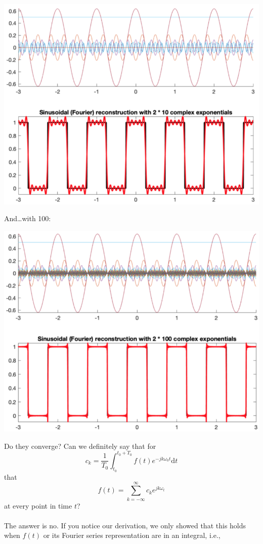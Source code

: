 \documentclass[10pt]{article}
\begin{document}
\begin{center}
    \includegraphics[scale=0.7]{W4_11.png}
\end{center}
And\dots with 100:
\begin{center}
    \includegraphics[scale=0.7]{W4_12.png}
\end{center}
\pagebreak
Do they converge?  Can we definitely say that for
\[c_k = \frac{1}{T_0} \int_{t_0}^{t_0 + T_0} f(t) e^{-jk\omega_0 t} \text{d}t\]
that
\[f(t) = \sum_{k = -\infty}^\infty c_k e^{jk\omega_t}\]
at every point in time $t$?\\\\
The answer is no.  If you notice our derivation, we only showed that this holds when $f(t)$ or its Fourier series representation are in an integral, i.e.,
\end{document}
